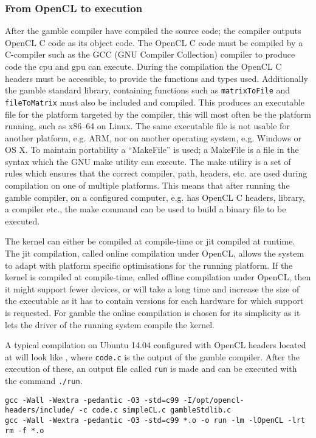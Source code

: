 \subsubsection*{From OpenCL to execution}\label{ssub:makefile}
After the \gls{gamble} compiler have compiled the source code; the compiler outputs OpenCL C code as its object code.
The OpenCL C code must be compiled by a C-compiler such as the GCC (GNU Compiler Collection) compiler to produce code the \acrshort{cpu} and \acrshort{gpu} can execute.
During the compilation the OpenCL C headers must be accessible, to provide the functions and types used. 
Additionally the \gls{gamble} standard library, containing functions such as \texttt{matrixToFile} and \texttt{fileToMatrix} must also be included and compiled. 
This produces an executable file for the platform targeted by the compiler, this will most often be the platform running, such as x86--64 on Linux.
The same executable file is not usable for another platform, e.g. ARM, nor on another operating system, e.g. Windows or OS X.
To maintain portability a ``MakeFile'' is used; a MakeFile is a file in the syntax which the GNU make utility can execute. 
The make utiliry is a set of rules which ensures that the correct compiler, path, headers, etc. are used during compilation on one of multiple platforms. 
This means that after running the \gls{gamble} compiler, on a configured computer, e.g. has OpenCL C headers, library, a compiler etc., the make command can be used to build a binary file to be executed.

The kernel can either be compiled at compile-time or \acrshort{jit} compiled at runtime.
The \acrshort{jit} compilation, called online compilation under OpenCL, allows the system to adapt with platform specific optimisations for the running platform.
If the kernel is compiled at compile-time, called offline compilation under OpenCL, then it might support fewer devices, or will take a long time and increase the size of the executable as it has to contain versions for each hardware for which support is requested. \citep{openclbookjit}
For \gls{gamble} the online compilation is chosen for its simplicity as it lets the driver of the running system compile the kernel. 

A typical compilation on Ubuntu 14.04 configured with OpenCL headers located at  will look like , where \texttt{code.c} is the output of the \gls{gamble} compiler.
After the execution of these, an output file called \texttt{run} is made and can be executed with the command \texttt{./run}. 

\begin{lstlisting}[caption=The commands executed by the make command according to the rules of the MakeFile,numbers=none,frame=tlrb,label={lst:makecommands}]
gcc -Wall -Wextra -pedantic -O3 -std=c99 -I/opt/opencl-headers/include/ -c code.c simpleCL.c gambleStdlib.c
gcc -Wall -Wextra -pedantic -O3 -std=c99 *.o -o run -lm -lOpenCL -lrt
rm -f *.o
\end{lstlisting}
